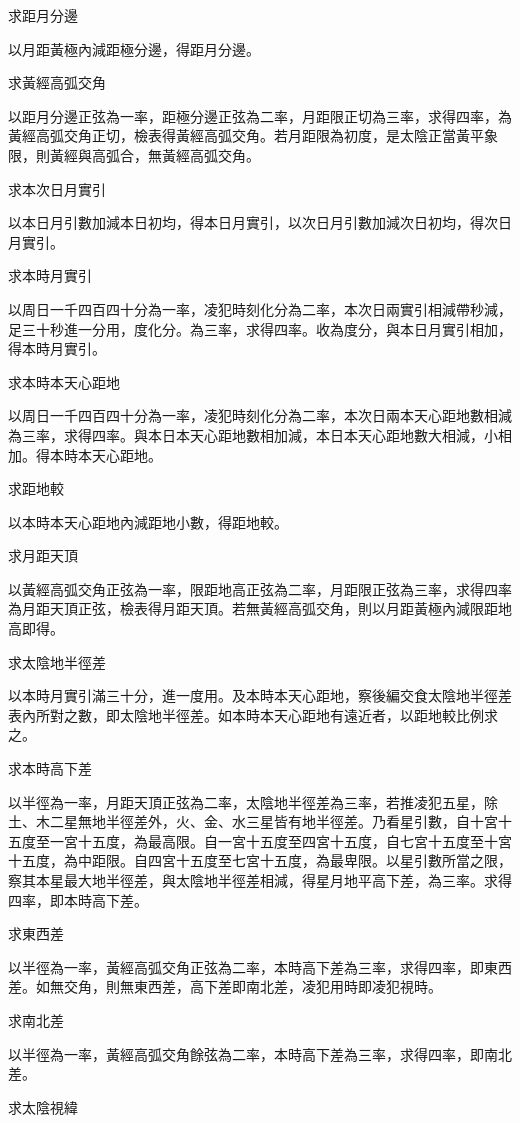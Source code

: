 \begin{pinyinscope}
求距月分邊

以月距黃極內減距極分邊，得距月分邊。

求黃經高弧交角

以距月分邊正弦為一率，距極分邊正弦為二率，月距限正切為三率，求得四率，為黃經高弧交角正切，檢表得黃經高弧交角。若月距限為初度，是太陰正當黃平象限，則黃經與高弧合，無黃經高弧交角。

求本次日月實引

以本日月引數加減本日初均，得本日月實引，以次日月引數加減次日初均，得次日月實引。

求本時月實引

以周日一千四百四十分為一率，凌犯時刻化分為二率，本次日兩實引相減帶秒減，足三十秒進一分用，度化分。為三率，求得四率。收為度分，與本日月實引相加，得本時月實引。

求本時本天心距地

以周日一千四百四十分為一率，凌犯時刻化分為二率，本次日兩本天心距地數相減為三率，求得四率。與本日本天心距地數相加減，本日本天心距地數大相減，小相加。得本時本天心距地。

求距地較

以本時本天心距地內減距地小數，得距地較。

求月距天頂

以黃經高弧交角正弦為一率，限距地高正弦為二率，月距限正弦為三率，求得四率為月距天頂正弦，檢表得月距天頂。若無黃經高弧交角，則以月距黃極內減限距地高即得。

求太陰地半徑差

以本時月實引滿三十分，進一度用。及本時本天心距地，察後編交食太陰地半徑差表內所對之數，即太陰地半徑差。如本時本天心距地有遠近者，以距地較比例求之。

求本時高下差

以半徑為一率，月距天頂正弦為二率，太陰地半徑差為三率，若推凌犯五星，除土、木二星無地半徑差外，火、金、水三星皆有地半徑差。乃看星引數，自十宮十五度至一宮十五度，為最高限。自一宮十五度至四宮十五度，自七宮十五度至十宮十五度，為中距限。自四宮十五度至七宮十五度，為最卑限。以星引數所當之限，察其本星最大地半徑差，與太陰地半徑差相減，得星月地平高下差，為三率。求得四率，即本時高下差。

求東西差

以半徑為一率，黃經高弧交角正弦為二率，本時高下差為三率，求得四率，即東西差。如無交角，則無東西差，高下差即南北差，凌犯用時即凌犯視時。

求南北差

以半徑為一率，黃經高弧交角餘弦為二率，本時高下差為三率，求得四率，即南北差。

求太陰視緯


\end{pinyinscope}
